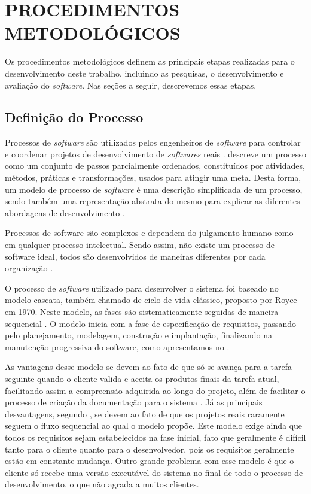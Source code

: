 \section{PROCEDIMENTOS METODOLÓGICOS}

Os procedimentos metodológicos definem as principais etapas realizadas para o desenvolvimento deste trabalho, incluindo as pesquisas, o desenvolvimento e avaliação do \textit{software}. Nas seções a 
seguir, descrevemos essas etapas.

\subsection{Definição do Processo}

Processos de \textit{software} são utilizados pelos engenheiros de \textit{software} para controlar e coordenar projetos de desenvolvimento de \textit{softwares} reais \cite{talma2006desenvolvimento}. 
 descreve um processo como um conjunto de passos parcialmente  ordenados, constituídos por atividades, métodos, práticas e transformações, usados para atingir uma meta. 
Desta forma, um modelo de processo de \textit{software} é uma descrição simplificada de um processo, sendo também uma representação abstrata do mesmo para explicar as diferentes abordagens de 
desenvolvimento \cite{sommerville2003engenharia}.

Processos de software são complexos e dependem do julgamento humano como em qualquer processo intelectual. Sendo assim, não existe um processo de software ideal, todos são desenvolvidos de maneiras 
diferentes por cada organização \cite{sommerville2003engenharia}.

O processo de \textit{software} utilizado para desenvolver o sistema foi baseado no modelo cascata, também chamado de ciclo de vida clássico, proposto por Royce em 1970. Neste modelo, as fases são 
sistematicamente seguidas de maneira sequencial \cite{pressman2006engenharia}. O modelo inicia com a fase de especificação de requisitos, passando pelo planejamento, modelagem, construção e 
implantação, finalizando na manutenção progressiva do software, como apresentamos no .

As vantagens desse modelo se devem ao fato de que só se avança para a tarefa seguinte quando o cliente valida e aceita os produtos finais da tarefa atual, facilitando assim a compreensão adquirida ao 
longo do projeto, além de facilitar o processo de criação da documentação para o sistema \cite{pressman2006engenharia}. Já as principais desvantagens, segundo , se 
devem ao fato de que os projetos reais raramente seguem o fluxo sequencial ao qual o modelo propõe. Este modelo exige ainda que todos os requisitos sejam estabelecidos na fase 
inicial, fato que geralmente é difícil tanto para o cliente quanto para o desenvolvedor, pois os requisitos geralmente est\~ao em constante mudan\c{c}a. Outro grande problema com esse modelo é que o 
cliente só recebe uma versão executável do sistema no final de todo o processo de desenvolvimento, o que não agrada a muitos clientes.

